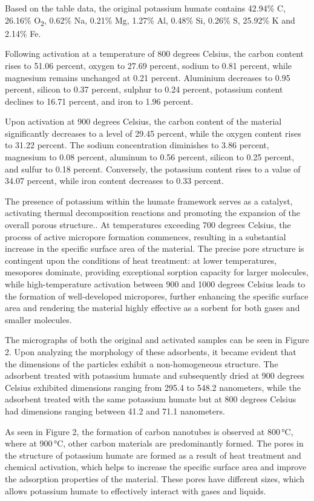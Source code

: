 \begin{multicols}{2}
Based on the table data, the original potassium humate contains 42.94\%
C, 26.16\% O\textsubscript{2}, 0.62\% Na, 0.21\% Mg, 1.27\% Al, 0.48\%
Si, 0.26\% S, 25.92\% K and 2.14\% Fe.

Following activation at a temperature of 800 degrees Celsius, the carbon
content rises to 51.06 percent, oxygen to 27.69 percent, sodium to 0.81
percent, while magnesium remains unchanged at 0.21 percent. Aluminium
decreases to 0.95 percent, silicon to 0.37 percent, sulphur to 0.24
percent, potassium content declines to 16.71 percent, and iron to 1.96
percent.

Upon activation at 900 degrees Celsius, the carbon content of the
material significantly decreases to a level of 29.45 percent, while the
oxygen content rises to 31.22 percent. The sodium concentration
diminishes to 3.86 percent, magnesium to 0.08 percent, aluminum to 0.56
percent, silicon to 0.25 percent, and sulfur to 0.18 percent.
Conversely, the potassium content rises to a value of 34.07 percent,
while iron content decreases to 0.33 percent.

The presence of potassium within the humate framework serves as a
catalyst, activating thermal decomposition reactions and promoting the
expansion of the overall porous structure.. At temperatures exceeding
700 degrees Celsius, the process of active micropore formation
commences, resulting in a substantial increase in the specific surface
area of the material. The precise pore structure is contingent upon the
conditions of heat treatment: at lower temperatures, mesopores dominate,
providing exceptional sorption capacity for larger molecules, while
high-temperature activation between 900 and 1000 degrees Celsius leads
to the formation of well-developed micropores, further enhancing the
specific surface area and rendering the material highly effective as a
sorbent for both gases and smaller molecules.

The micrographs of both the original and activated samples can be seen
in Figure 2. Upon analyzing the morphology of these adsorbents, it
became evident that the dimensions of the particles exhibit a
non-homogeneous structure. The adsorbent treated with potassium humate
and subsequently dried at 900 degrees Celsius exhibited dimensions
ranging from 295.4 to 548.2 nanometers, while the adsorbent treated with
the same potassium humate but at 800 degrees Celsius had dimensions
ranging between 41.2 and 71.1 nanometers.

As seen in Figure 2, the formation of carbon nanotubes is observed at
800\,°C, where at 900\,°C, other carbon materials are predominantly
formed. The pores in the structure of potassium humate are formed as a
result of heat treatment and chemical activation, which helps to
increase the specific surface area and improve the adsorption properties
of the material. These pores have different sizes, which allows
potassium humate to effectively interact with gases and liquids.


\end{multicols}
